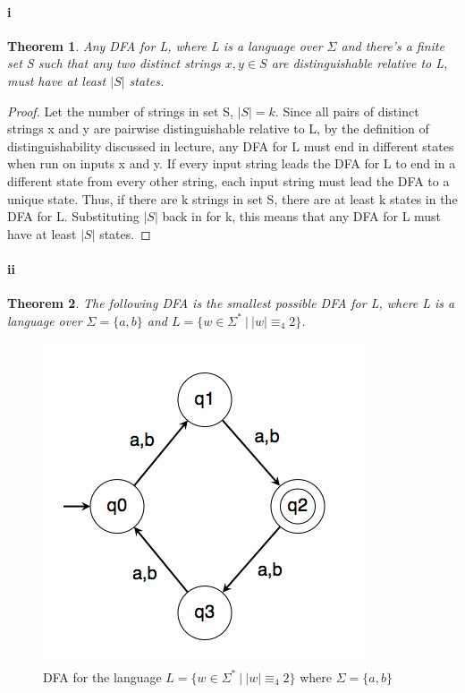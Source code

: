 \documentclass[10pt,letter]{article}
\newtheorem*{thm}{Theorem}
\begin{document}
\paragraph{i}
\begin{thm}Any DFA for L, where L is a language over $\Sigma$ and there's a finite set S such that any two distinct strings $x,y\in S$ are distinguishable relative to L, must have at least $|S|$ states. \end{thm}

\begin{proof} Let the number of strings in set S, $|S| = k$. Since all pairs of distinct strings x and y are pairwise distinguishable relative to L, by the definition of distinguishability discussed in lecture, any DFA for L must end in different states when run on inputs x and y. If every input string leads the DFA for L to end in a different state from every other string, each input string must lead the DFA to a unique state. Thus, if there are k strings in set S, there are at least k states in the DFA for L. Substituting $|S|$ back in for k, this means that any DFA for L must have at least $|S|$ states.
\end{proof}

\paragraph{ii}
\begin{thm} The following DFA is the smallest possible DFA for L, where L is a language over $\Sigma = \{a,b\}$ and $L=\{w \in \Sigma^*\ |\ |w| \equiv_4 2\}$.\end{thm}

\begin{figure}[h]
    \centering
    \includegraphics[width=0.4\linewidth]{hw6_4ii.png}
    \caption{DFA for the language $L=\{w \in \Sigma^*\ |\ |w| \equiv_4 2\}$ where $\Sigma = \{a,b\}$}
    \label{fig:q4ii}
\end{figure}
\end{document}
